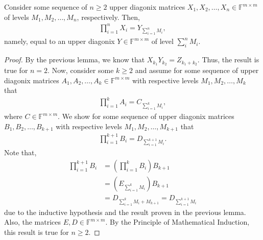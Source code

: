 \documentclass[12pt]{article}
\newenvironment{corollary}[2][Corollary]{\begin{trivlist} \item[\hskip \labelsep {\bfseries #1}\hskip \labelsep {\bfseries #2.}]}{\end{trivlist}}
\begin{document}
\begin{corollary}{Diagonix 1}
  Consider some sequence of $n\geq 2$ upper diagonix matrices $X_{1},X_{2},\dots,X_{n}\in \mathbb{F}^{m\times m}$ of levels $M_{1},M_{2},\dots,M_{n}$, respectively. Then, 
\begin{align*}
  \prod_{i=1}^{n}X_{i} = Y_{\sum_{i=1}^{n} M_{i}},
\end{align*}
namely, equal to an upper diagonix $Y\in \mathbb{F}^{m\times m}$ of level $\sum_{i}^{n}M_{i}$. 
\begin{proof}
  By the previous lemma, we know that $X_{k_{1}}Y_{k_{2}} = Z_{k_{1}+k_{2}}$. Thus, the result is true for $n=2$. Now, consider some $k\geq 2$ and assume for some sequence of upper diagonix matrices $A_{1},A_{2},\dots,A_{k}\in \mathbb{F}^{m\times m}$ with respective levels $M_{1},M_{2},\dots,M_{k}$ that 
\begin{align*}
  \prod_{i=1}^{k} A_{i} = C_{\sum_{i=1}^{k}M_{i}},
\end{align*}
where $C\in\mathbb{F}^{m\times m}$. We show for some sequence of upper diagonix matrices $B_{1},B_{2},\dots,B_{k+1}$ with respective levels $M_{1},M_{2},\dots,M_{k+1}$ that 
\begin{align*}
  \prod_{i=1}^{k+1} B_{i} = D_{\sum_{i=1}^{k+1}M_{i}}.
\end{align*}
Note that,
\begin{align*}
  \prod_{i=1}^{k+1} B_{i} &= \left(\prod_{i=1}^{k}B_{i}\right)B_{k+1}\\
&= \left(E_{\sum_{i=1}^{k}M_{i}}\right) B_{k+1}\\
  &= D_{\sum_{i=1}^{k}M_{i}+M_{k+1}} = D_{\sum_{i=1}^{k+1}M_{i}}
\end{align*}
due to the inductive hypothesis and the result proven in the previous lemma. Also, the  matrices $E,D\in \mathbb{F}^{m\times m}$. By the Principle of Mathematical Induction, this result is true for $n\geq2$.
\end{proof}
\end{corollary}
\end{document}
